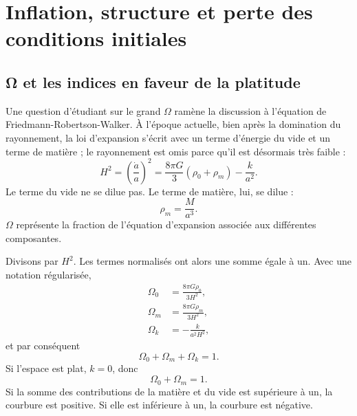 \chapter{Inflation, structure et perte des conditions initiales}

\section{{\proseunicodefont Ω} et les indices en faveur de la platitude}

Une question d’étudiant sur le grand \(\Omega\) ramène la discussion à l’équation de Friedmann-Robertson-Walker. À l’époque actuelle, bien après la domination du rayonnement, la loi d’expansion s’écrit avec un terme d’énergie du vide et un terme de matière ; le rayonnement est omis parce qu’il est désormais très faible :
\begin{equation}
H^2=\left(\frac{\dot a}{a}\right)^2=\frac{8\pi G}{3}\left(\rho_0+\rho_m\right)-\frac{k}{a^2}.
\end{equation}
Le terme du vide ne se dilue pas. Le terme de matière, lui, se dilue :
\begin{equation}
\rho_m=\frac{M}{a^3}.
\end{equation}
\(\Omega\) représente la fraction de l’équation d’expansion associée aux différentes composantes.

Divisons par \(H^2\). Les termes normalisés ont alors une somme égale à un. Avec une notation régularisée,
\begin{equation}
\begin{aligned}
\Omega_0&=\frac{8\pi G\rho_0}{3H^2},\\
\Omega_m&=\frac{8\pi G\rho_m}{3H^2},\\
\Omega_k&=-\frac{k}{a^2H^2},
\end{aligned}
\end{equation}
et par conséquent
\begin{equation}
\Omega_0+\Omega_m+\Omega_k=1.
\end{equation}
Si l’espace est plat, \(k=0\), donc
\begin{equation}
\Omega_0+\Omega_m=1.
\end{equation}
Si la somme des contributions de la matière et du vide est supérieure à un, la courbure est positive. Si elle est inférieure à un, la courbure est négative.

